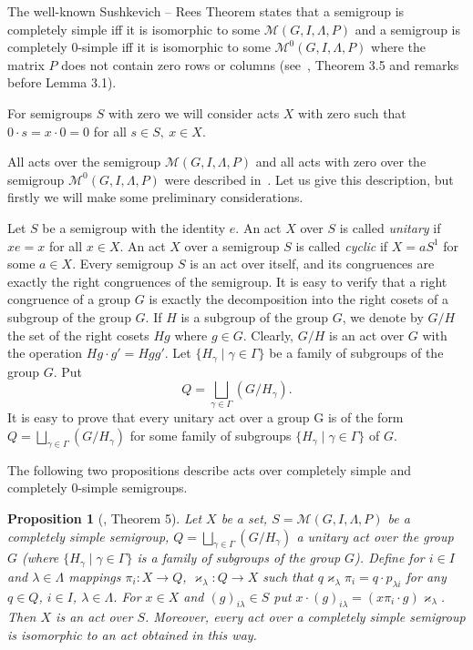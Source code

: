 \documentclass{birkau}
\numberwithin{equation}{section}
\theoremstyle{plain}
\newtheorem{proposition}[theorem]{Proposition}
\theoremstyle{definition}
\begin{document}
	The well-known Sushkevich -- Rees Theorem states that a semigroup is completely simple iff it is isomorphic to some $\mathcal{M}(G, I,\Lambda,P)$ and a semigroup is completely 0-simple iff it is isomorphic to some $\mathcal{M}^0(G,I,\Lambda,P)$ where the matrix $P$ does not contain zero rows or columns (see~\cite{cliff}, Theorem 3.5 and remarks before Lemma 3.1).
	
	For semigroups $S$ with zero we will consider acts $X$ with zero such that $0 \cdot s = x \cdot 0 = 0$ for all $s\in S,\ x\in X$.
	
	All acts over the semigroup $\mathcal{M}(G,I,\Lambda,P)$ and all acts with zero over the semigroup $\mathcal{M}^0(G,I,\Lambda,P)$ were described in~\cite{avdeev}. Let us give this description, but firstly we will make some preliminary considerations.
	
	Let $S$ be a semigroup with the identity $e$. An act $X$ over $S$ is called \textit{unitary} if $xe=x$ for all $x \in X$. An act $X$ over a semigroup $S$ is called \textit{cyclic} if $X=aS^1$ for some $a \in X$. Every semigroup $S$ is an act over itself, and its congruences are exactly the right congruences of the semigroup. It is easy to verify that a right congruence of a group $G$ is exactly the decomposition into the right cosets of a subgroup of the group $G$. If $H$ is a subgroup of the group $G$, we denote by $G/H$ the set of the right cosets $Hg$ where $g \in G$. Clearly, $G/H$ is an act over $G$ with the operation $Hg \cdot g' = Hgg'$. Let $\{ H_\gamma \mid \gamma \in \Gamma \} $ be a family of subgroups of the group $G$. Put $$ Q = \bigsqcup_{\gamma \in \Gamma} (G/H_\gamma). $$ It is easy to prove that every unitary act over a group G is of the form $ Q = \bigsqcup_{\gamma \in \Gamma} (G/H_\gamma) $ for some family of subgroups $\{ H_{\gamma} \mid \gamma \in \Gamma \}$ of $G$.
	
	The following two propositions describe acts over completely simple and completely 0-simple semigroups.
	
	\begin{proposition}[\cite{avdeev}, Theorem 5] \label{pr01}
	    Let $X$ be a set, $S=\mathcal{M}(G,I,\Lambda,P)$ be a completely simple semigroup, $Q = \bigsqcup_{\gamma \in \Gamma} (G/H_\gamma) $ a unitary act over the group $G$ (where $\{ H_\gamma \mid \gamma \in \Gamma \}$ is a family of subgroups of the group $G$). Define for $ i \in I$ and $\lambda \in \Lambda$  mappings $\pi_i:X \rightarrow Q$, $\varkappa_\lambda: Q \rightarrow X$ such that $q \varkappa_\lambda \pi_i = q \cdot p_{\lambda i}$ for any $q \in Q$, $i \in I$, $\lambda \in \Lambda$. For $x \in X$ and $(g)_{i \lambda} \in S$ put $x \cdot (g)_{i \lambda} = (x \pi_i \cdot g)\varkappa_{\lambda}$. Then $X$ is an act over $S$. Moreover, every act over a completely simple semigroup is isomorphic to an act obtained in this way.
	\end{proposition}
	
\end{document}
